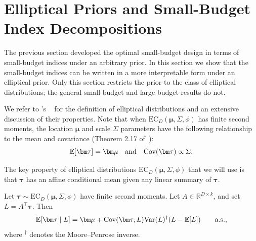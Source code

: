 \section{Elliptical Priors and Small-Budget Index Decompositions}
\label{sec:elliptical-decompositions-appendix}

The previous section developed the optimal small-budget design in terms of small-budget indices under an arbitrary prior.
In this section we show that the small-budget indices can be written in a more interpretable form under an elliptical prior.
Only this section restricts the prior to the class of elliptical distributions; the general small-budget and large-budget results do not.

We refer to \citeauthor{FangKo90}'s ~\cite{FangKo90} for the definition of elliptical distributions and an extensive discussion of their properties.
Note that when $\mathrm{EC}_D(\bm\mu,\Sigma,\phi)$ has finite second moments, the location $\bm\mu$ and scale $\Sigma$ parameters have the following relationship to the mean and covariance (Theorem 2.17 of~\cite{FangKo90}):
\[
  \E[\bm\tau]=\bm\mu \quad\text{and}\quad \cov(\bm\tau) \propto \Sigma.
\]

The key property of elliptical distributions $\mathrm{EC}_D(\bm\mu,\Sigma,\phi)$ that we will use is that $\bm\tau$ has an affine conditional mean given any linear summary of $\bm\tau$.

\begin{lemma}
  \label{lem:elliptical-conditional-mean-singular-appendix}
  Let \(\bm\tau\sim\mathrm{EC}_D(\bm\mu,\Sigma,\phi)\) have finite second moments.
  Let \(A\in\mathbb R^{D\times k}\), and set \(L=A^\top\bm\tau\).
  Then
  \[
    \E[\bm\tau\mid L]
    =
    \bm\mu
    +
    \cov(\bm\tau,L)\var(L)^\dagger(L-\E[L])
    \qquad\text{a.s.},
  \]
  where \({}^\dagger\) denotes the Moore--Penrose inverse.
\end{lemma}

